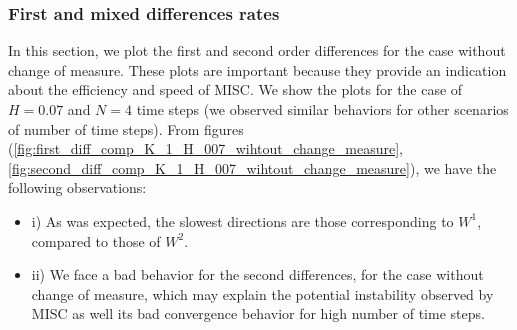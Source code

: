 \documentclass[11pt]{article}
\begin{document}
%
%
%

\newpage
\subsubsection{First and mixed differences rates}\label{sec:First and mixed differences rates}


In this section, we plot the first and second order differences for the case without change of measure. These plots are important because they provide an indication about the efficiency and speed of MISC. We show the plots for the case of $H=0.07$ and  $N=4$ time steps (we observed similar behaviors for other scenarios of number of time steps). From figures (\ref{fig:first_diff_comp_K_1_H_007_wihtout_change_measure},\ref{fig:second_diff_comp_K_1_H_007_wihtout_change_measure}), we have the following observations:
\begin{itemize}
	\item i) As was expected, the slowest directions are those corresponding to $W^1$, compared to those of   $W^2$.
	
	\item ii)  We face a bad behavior for the second differences, for the case without change of measure, which may explain the potential instability observed by MISC as well its bad convergence behavior for high number of time steps. 
\end{itemize}
\end{document}
